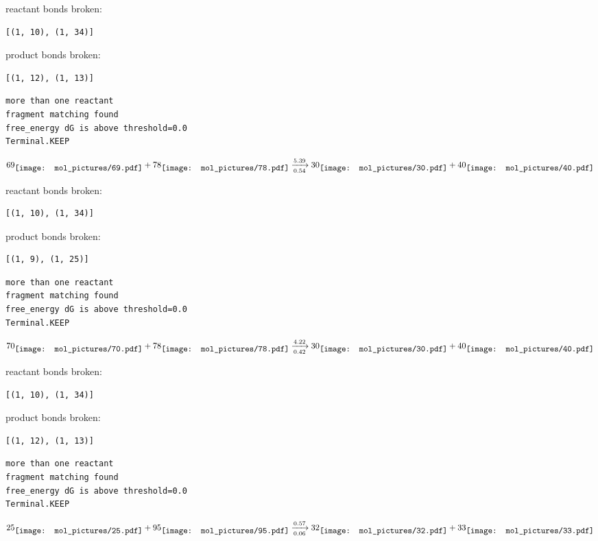 \documentclass{article}
\begin{document}
reactant bonds broken:\begin{verbatim}
[(1, 10), (1, 34)]
\end{verbatim}
product bonds broken:\begin{verbatim}
[(1, 12), (1, 13)]
\end{verbatim}




\vspace{1cm}
\begin{verbatim}
more than one reactant
fragment matching found
free_energy dG is above threshold=0.0
Terminal.KEEP
\end{verbatim}
$$
69
\raisebox{-.5\height}{\texttt{[image: mol\_pictures/69.pdf]}}
+
78
\raisebox{-.5\height}{\texttt{[image: mol\_pictures/78.pdf]}}
\xrightarrow[0.54]{5.39}
30
\raisebox{-.5\height}{\texttt{[image: mol\_pictures/30.pdf]}}
+
40
\raisebox{-.5\height}{\texttt{[image: mol\_pictures/40.pdf]}}
$$


reactant bonds broken:\begin{verbatim}
[(1, 10), (1, 34)]
\end{verbatim}
product bonds broken:\begin{verbatim}
[(1, 9), (1, 25)]
\end{verbatim}




\vspace{1cm}
\begin{verbatim}
more than one reactant
fragment matching found
free_energy dG is above threshold=0.0
Terminal.KEEP
\end{verbatim}
$$
70
\raisebox{-.5\height}{\texttt{[image: mol\_pictures/70.pdf]}}
+
78
\raisebox{-.5\height}{\texttt{[image: mol\_pictures/78.pdf]}}
\xrightarrow[0.42]{4.22}
30
\raisebox{-.5\height}{\texttt{[image: mol\_pictures/30.pdf]}}
+
40
\raisebox{-.5\height}{\texttt{[image: mol\_pictures/40.pdf]}}
$$


reactant bonds broken:\begin{verbatim}
[(1, 10), (1, 34)]
\end{verbatim}
product bonds broken:\begin{verbatim}
[(1, 12), (1, 13)]
\end{verbatim}




\vspace{1cm}
\begin{verbatim}
more than one reactant
fragment matching found
free_energy dG is above threshold=0.0
Terminal.KEEP
\end{verbatim}
$$
25
\raisebox{-.5\height}{\texttt{[image: mol\_pictures/25.pdf]}}
+
95
\raisebox{-.5\height}{\texttt{[image: mol\_pictures/95.pdf]}}
\xrightarrow[0.06]{0.57}
32
\raisebox{-.5\height}{\texttt{[image: mol\_pictures/32.pdf]}}
+
33
\raisebox{-.5\height}{\texttt{[image: mol\_pictures/33.pdf]}}
$$
\end{document}
